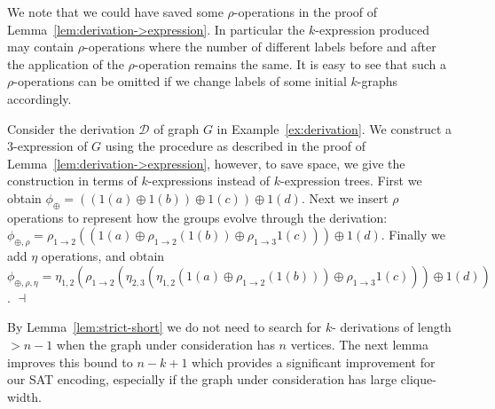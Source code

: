 \documentclass[10pt,usletter]{article}
\theoremstyle{remark}
\newtheorem{example}{Example}
\renewenvironment{example}{\begin{ex}}{\hfill
    $\dashv$\end{ex}\medskip}
\newcommand{\DDD}{\mathcal{D}}
\newcommand{\hy}{\hbox{-}\nobreak\hskip0pt}
\begin{document}
 
We note that we could have saved some $\rho$\hy operations in the
proof of Lemma~\ref{lem:derivation->expression}.  In particular the
$k$\hy expression produced may contain $\rho$\hy operations where the
number of different labels before and after the application of the
$\rho$\hy operation remains the same. It is easy to see that such a
$\rho$\hy operations can be omitted if we change labels of some
initial $k$\hy graphs accordingly.

\begin{example}Consider the derivation $\DDD$ of graph $G$ in
  Example~\ref{ex:derivation}.  We construct a $3$\hy expression of
  $G$ using the procedure as described in the proof of
  Lemma~\ref{lem:derivation->expression}, however, to save space, we
  give the construction in terms of $k$\hy expressions instead of
  $k$\hy expression trees.  First we obtain $\phi_\oplus= ((1(a)\oplus
  1(b)) \oplus 1(c)) \oplus 1(d)$.  Next we insert $\rho$ operations
  to represent how the groups evolve through the derivation:
  $\phi_{\oplus,\rho}= \rho_{1\rightarrow 2} ( ( 1(a)\oplus
  \rho_{1\rightarrow 2}(1(b) ) \oplus \rho_{1\rightarrow 3 } 1(c) ) )
  \oplus 1(d)$.  Finally we add $\eta$ operations, and obtain
  $\phi_{\oplus,\rho,\eta}= \eta_{1,2}( \rho_{1\rightarrow 2}(
  \eta_{2,3}( \eta_{1,2}( 1(a)\oplus \rho_{1\rightarrow 2}(1(b) ) )
  \oplus \rho_{1\rightarrow 3 } 1(c) ) ) \oplus 1(d) )$.
\end{example}

By Lemma~\ref{lem:strict-short} we do not need to search for $k$\hy
derivations of length $>n-1$ when the graph under consideration has
$n$ vertices.  The next lemma improves this bound to $n-k+1$ which
provides a significant improvement for our SAT encoding, especially if
the graph under consideration has large clique-width.
\end{document}
